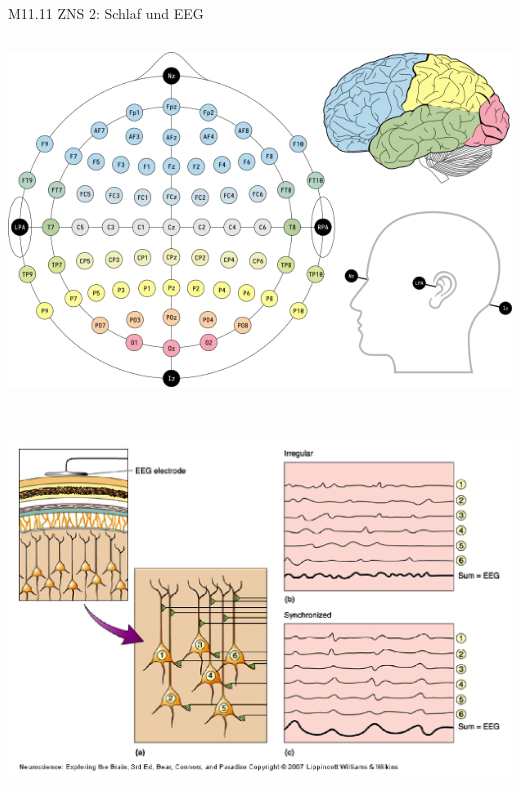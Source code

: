 \documentclass{beamer}
\begin{document}
\begin{frame}{M11.11 ZNS 2: Schlaf und EEG} 

\begin{columns}[c]

\begin{column}{5cm}

\begin{center}
    
    \includegraphics[width=\textwidth]{EEG_10-10_system.png}
    
    
    \end{center}
    
    $\,$\\
    
    \begin{center}
        \includegraphics[width=\textwidth]{EEG_synchrony..png}

\end{center}


\end{column}
\end{columns}
\end{frame}
\end{document}
